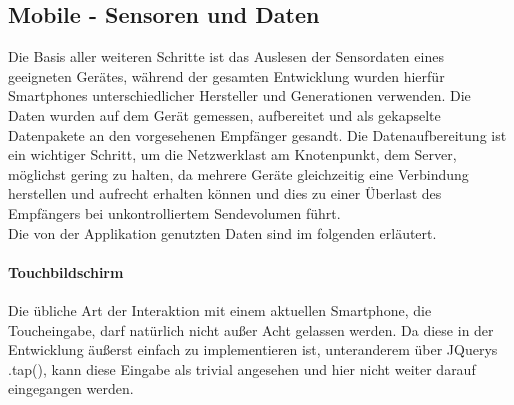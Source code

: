 \documentclass[a4paper]{spie}  %
\begin{document}
\subsection{Mobile - Sensoren und Daten}
Die Basis aller weiteren Schritte ist das Auslesen der Sensordaten eines geeigneten Gerätes, während der gesamten Entwicklung wurden hierfür Smartphones unterschiedlicher Hersteller und Generationen verwenden. Die Daten wurden auf dem Gerät gemessen, aufbereitet und als gekapselte Datenpakete an den vorgesehenen Empfänger gesandt. Die Datenaufbereitung ist ein wichtiger Schritt, um die Netzwerklast am Knotenpunkt, dem Server, möglichst gering zu halten, da mehrere Geräte gleichzeitig eine Verbindung herstellen und aufrecht erhalten können und dies zu einer Überlast des Empfängers bei unkontrolliertem Sendevolumen führt.\\
Die von der Applikation genutzten Daten sind im folgenden erläutert.
\paragraph{Touchbildschirm}
Die übliche Art der Interaktion mit einem aktuellen Smartphone, die Toucheingabe, darf natürlich nicht außer Acht gelassen werden. Da diese in der Entwicklung äußerst einfach zu implementieren ist, unteranderem über JQuerys .tap(), kann diese Eingabe als trivial angesehen und hier nicht weiter darauf eingegangen werden.

\end{document}
